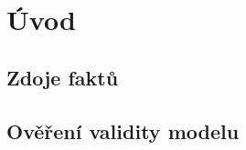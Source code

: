 \documentclass[../projekt.tex]{subfiles}
\begin{document}

\chapter{Úvod}\label{uvod}

\section{Zdoje faktů}

\section{Ověření validity modelu}
\end{document}
